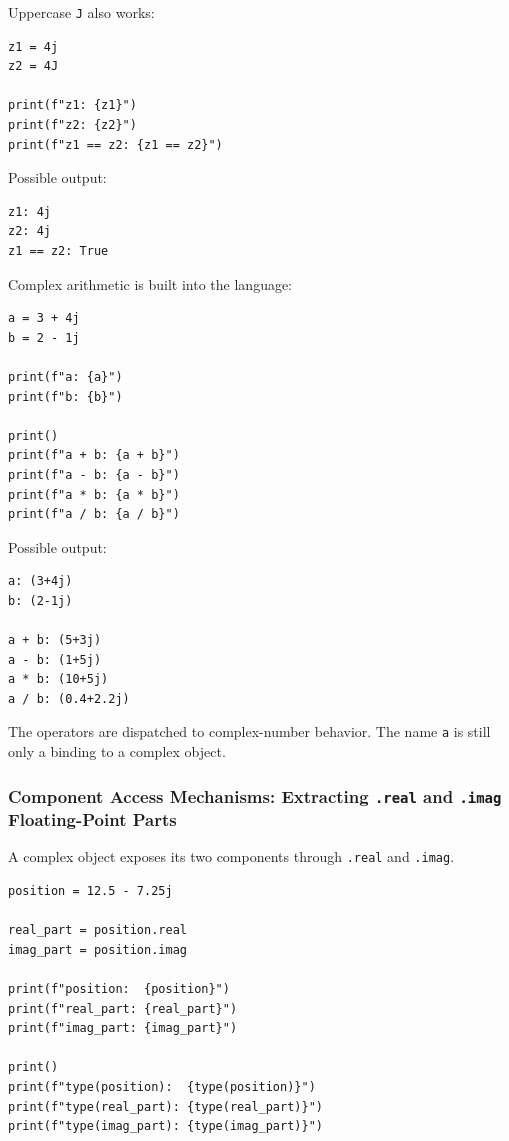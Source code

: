 Uppercase \texttt{J} also works:

\begin{verbatim}
z1 = 4j
z2 = 4J

print(f"z1: {z1}")
print(f"z2: {z2}")
print(f"z1 == z2: {z1 == z2}")
\end{verbatim}

Possible output:

\begin{verbatim}
z1: 4j
z2: 4j
z1 == z2: True
\end{verbatim}

Complex arithmetic is built into the language:

\begin{verbatim}
a = 3 + 4j
b = 2 - 1j

print(f"a: {a}")
print(f"b: {b}")

print()
print(f"a + b: {a + b}")
print(f"a - b: {a - b}")
print(f"a * b: {a * b}")
print(f"a / b: {a / b}")
\end{verbatim}

Possible output:

\begin{verbatim}
a: (3+4j)
b: (2-1j)

a + b: (5+3j)
a - b: (1+5j)
a * b: (10+5j)
a / b: (0.4+2.2j)
\end{verbatim}

The operators are dispatched to complex-number behavior. The name \texttt{a} is still only a binding to a complex object.

\subsubsection{Component Access Mechanisms: Extracting \texttt{.real} and \texttt{.imag} Floating-Point Parts}

A complex object exposes its two components through \texttt{.real} and \texttt{.imag}.

\begin{verbatim}
position = 12.5 - 7.25j

real_part = position.real
imag_part = position.imag

print(f"position:  {position}")
print(f"real_part: {real_part}")
print(f"imag_part: {imag_part}")

print()
print(f"type(position):  {type(position)}")
print(f"type(real_part): {type(real_part)}")
print(f"type(imag_part): {type(imag_part)}")
\end{verbatim}

